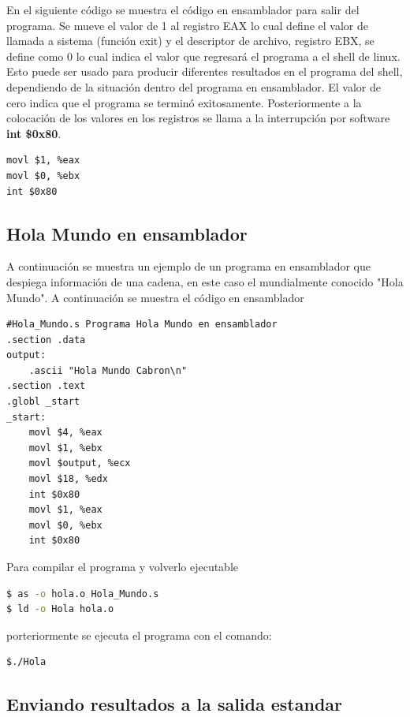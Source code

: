 \documentclass[12pt, twoside]{report}
\begin{document}
En el siguiente código se muestra el código en ensamblador para salir del programa. Se mueve el valor de 1 al registro EAX lo cual define el valor de llamada a sistema (función exit) y el descriptor de archivo, registro EBX, se define como 0 lo cual indica el valor que regresará el programa a el shell de linux. Esto puede ser usado para producir diferentes resultados en el programa del shell, dependiendo de la situación dentro del programa en ensamblador. El valor de cero indica que el programa se terminó exitosamente. Posteriormente a la colocación de los valores en los registros se llama a la interrupción por software \textbf{int \$0x80}.

\begin{lstlisting}[language={[x86masm]Assembler}]
movl $1, %eax
movl $0, %ebx
int $0x80   
\end{lstlisting}
   
\subsection{Hola Mundo en ensamblador}

A continuación se muestra un ejemplo de un programa en ensamblador que despiega información de una cadena, en este caso el mundialmente conocido "Hola Mundo". A continuación se muestra el código en ensamblador

\begin{lstlisting}[language={[x86masm]Assembler}]
#Hola_Mundo.s Programa Hola Mundo en ensamblador
.section .data
output:
	.ascii "Hola Mundo Cabron\n"
.section .text
.globl _start
_start:
	movl $4, %eax
	movl $1, %ebx
	movl $output, %ecx
	movl $18, %edx
	int $0x80
	movl $1, %eax
	movl $0, %ebx
	int $0x80
\end{lstlisting}

Para compilar el programa y volverlo ejecutable 

\begin{lstlisting}[language=bash]
$ as -o hola.o Hola_Mundo.s
$ ld -o Hola hola.o
\end{lstlisting}

porteriormente se ejecuta el programa con el comando:
\begin{lstlisting}[language=bash]
$./Hola
\end{lstlisting}

\subsection{Enviando resultados a la salida estandar}
\end{document}
